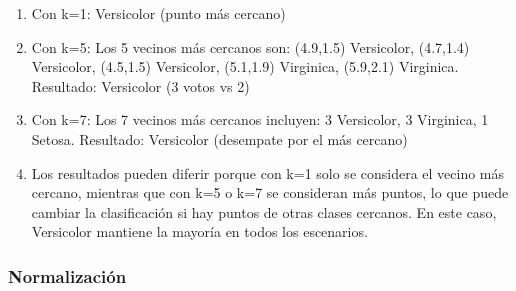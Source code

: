 \documentclass[12pt]{article}
\begin{document}
\begin{enumerate}
    \item Con k=1: Versicolor (punto más cercano)
    \item Con k=5: Los 5 vecinos más cercanos son: (4.9,1.5) Versicolor, (4.7,1.4) Versicolor, (4.5,1.5) Versicolor, (5.1,1.9) Virginica, (5.9,2.1) Virginica. Resultado: Versicolor (3 votos vs 2)
    \item Con k=7: Los 7 vecinos más cercanos incluyen: 3 Versicolor, 3 Virginica, 1 Setosa. Resultado: Versicolor (desempate por el más cercano)
    \item Los resultados pueden diferir porque con k=1 solo se considera el vecino más cercano, mientras que con k=5 o k=7 se consideran más puntos, lo que puede cambiar la clasificación si hay puntos de otras clases cercanos. En este caso, Versicolor mantiene la mayoría en todos los escenarios.
\end{enumerate}

\subsubsection{Normalización}
\end{document}

